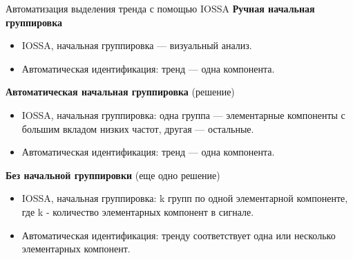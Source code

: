 \documentclass[ucs, notheorems, handout]{beamer}
\begin{document}
\begin{frame}{Автоматизация выделения тренда с помощью IOSSA}
    \textbf{Ручная начальная группировка}
        \footnotesize
        \begin{itemize}
            \item IOSSA, начальная группировка --- визуальный анализ.
            \item Автоматическая идентификация:  тренд --- одна компонента.
        \end{itemize}
        \pause
        \normalsize
    \textbf{Автоматическая начальная группировка} (решение)
        \footnotesize
        \begin{itemize}
            \item IOSSA, начальная группировка: одна группа --- элементарные компоненты с большим вкладом низких частот, другая --- остальные.
            \item Автоматическая идентификация: тренд --- одна компонента.
        \end{itemize}
        \pause
        \normalsize
    \textbf{Без начальной группировки} (еще одно решение)
        \footnotesize
        \begin{itemize}
            \item IOSSA, начальная группировка:  k групп по одной элементарной компоненте, где k - количество элементарных компонент в сигнале.
            \item Автоматическая идентификация: тренду соответствует одна или несколько элементарных компонент.
        \end{itemize}
\end{frame}
\end{document}
